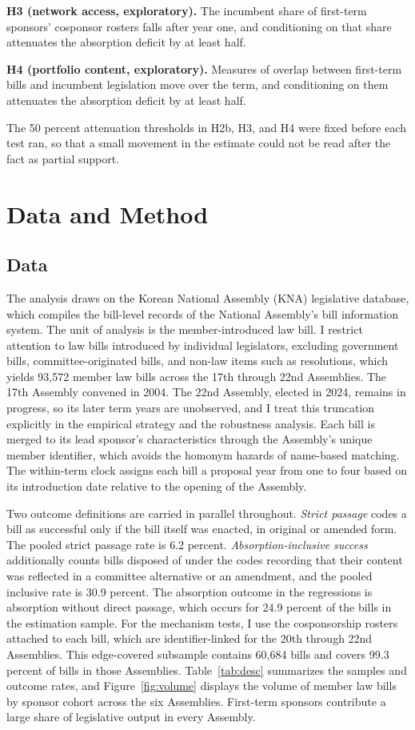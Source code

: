 \documentclass[11pt]{article}
\begin{document}
\textbf{H3 (network access, exploratory).} The incumbent share of first-term sponsors' cosponsor rosters falls after year one, and conditioning on that share attenuates the absorption deficit by at least half.

\textbf{H4 (portfolio content, exploratory).} Measures of overlap between first-term bills and incumbent legislation move over the term, and conditioning on them attenuates the absorption deficit by at least half.

The 50 percent attenuation thresholds in H2b, H3, and H4 were fixed before each test ran, so that a small movement in the estimate could not be read after the fact as partial support.

\section{Data and Method}

\subsection{Data}

The analysis draws on the Korean National Assembly (KNA) legislative database, which compiles the bill-level records of the National Assembly's bill information system. The unit of analysis is the member-introduced law bill. I restrict attention to law bills introduced by individual legislators, excluding government bills, committee-originated bills, and non-law items such as resolutions, which yields 93,572 member law bills across the 17th through 22nd Assemblies. The 17th Assembly convened in 2004. The 22nd Assembly, elected in 2024, remains in progress, so its later term years are unobserved, and I treat this truncation explicitly in the empirical strategy and the robustness analysis. Each bill is merged to its lead sponsor's characteristics through the Assembly's unique member identifier, which avoids the homonym hazards of name-based matching. The within-term clock assigns each bill a proposal year from one to four based on its introduction date relative to the opening of the Assembly.

Two outcome definitions are carried in parallel throughout. \textit{Strict passage} codes a bill as successful only if the bill itself was enacted, in original or amended form. The pooled strict passage rate is 6.2 percent. \textit{Absorption-inclusive success} additionally counts bills disposed of under the codes recording that their content was reflected in a committee alternative or an amendment, and the pooled inclusive rate is 30.9 percent. The absorption outcome in the regressions is absorption without direct passage, which occurs for 24.9 percent of the bills in the estimation sample. For the mechanism tests, I use the cosponsorship rosters attached to each bill, which are identifier-linked for the 20th through 22nd Assemblies. This edge-covered subsample contains 60,684 bills and covers 99.3 percent of bills in those Assemblies. Table~\ref{tab:desc} summarizes the samples and outcome rates, and Figure~\ref{fig:volume} displays the volume of member law bills by sponsor cohort across the six Assemblies. First-term sponsors contribute a large share of legislative output in every Assembly.
\end{document}
